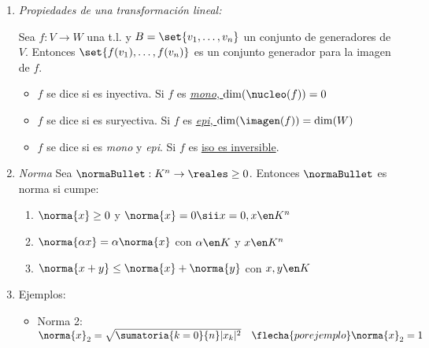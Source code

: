 \begin{enumerate}[label=\tiny\purple{\faIcon{snowman}}]
  \item \textit{Propiedades de una transformación lineal:}

        Sea $f: V \to W$ una t.l. y $B = \set{v_1, \ldots, v_n}$ un conjunto
        de generadores de $V$. Entonces $\set{f(v_1),\ldots, f(v_n) }$ es un conjunto
        generador para la imagen de $f$.

        \begin{itemize}
          \item $f$ se dice  si es inyectiva. Si $f$ es \ul{\textit{mono}, $\dim(\nucleo(f)) = 0$}
          \item $f$ se dice  si es suryectiva. Si $f$ es \ul{\textit{epi}, $\dim(\imagen(f)) = \dim(W)$}
          \item $f$ se dice  si es \textit{mono} y \textit{epi}. Si $f$ es \ul{iso es inversible}.
        \end{itemize}

  \item \textit{Norma}
        Sea $\normaBullet : K^n \to \reales\geq0  $. Entonces $\normaBullet$ es
        norma si cumpe:
        \begin{enumerate}[label=\arabic*)]
          \item $\norma{x} \geq 0$ y $\norma{x} = 0 \sii x = 0, x \en K^n$
          \item $\norma{\alpha x} = \alpha \norma{x}$ con $\alpha \en K$ y $x \en K^n$
          \item $\norma{x + y} \leq \norma{x} + \norma{y}$ con $x,y \en K$
        \end{enumerate}
  \item
        Ejemplos:
        \begin{itemize}
          \item Norma 2:
                $\norma{x}_2 = \sqrt{\sumatoria{k=0}{n} |x_k|^2 }
                  \quad
                  \flecha{por ejemplo}
                  \norma{x}_2 = 1 \quad$


\end{itemize}
\end{enumerate}
